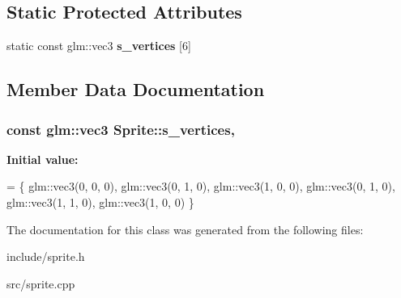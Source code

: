 \subsection*{Static Protected Attributes}
\begin{DoxyCompactItemize}
\item 
static const glm\+::vec3 {\bfseries s\+\_\+vertices} \mbox{[}6\mbox{]}
\end{DoxyCompactItemize}


\subsection{Member Data Documentation}
\hypertarget{class_sprite_ab59585a03a1cdb6bdb6d23b78173e73a}{}
\subsubsection[{s\+\_\+vertices}]{\setlength{\rightskip}{0pt plus 5cm}const glm\+::vec3 Sprite\+::s\+\_\+vertices\hspace{0.3cm}{\ttfamily [static]}, {\ttfamily [protected]}}\label{class_sprite_ab59585a03a1cdb6bdb6d23b78173e73a}
{\bfseries Initial value\+:}
\begin{DoxyCode}
= \{
    glm::vec3(0, 0, 0),
    glm::vec3(0, 1, 0),
    glm::vec3(1, 0, 0),
    glm::vec3(0, 1, 0),
    glm::vec3(1, 1, 0),
    glm::vec3(1, 0, 0)
\}
\end{DoxyCode}


The documentation for this class was generated from the following files\+:\begin{DoxyCompactItemize}
\item 
include/sprite.\+h\item 
src/sprite.\+cpp\end{DoxyCompactItemize}
